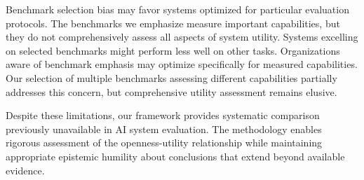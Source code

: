 Benchmark selection bias may favor systems optimized for particular evaluation protocols. The benchmarks we emphasize measure important capabilities, but they do not comprehensively assess all aspects of system utility. Systems excelling on selected benchmarks might perform less well on other tasks. Organizations aware of benchmark emphasis may optimize specifically for measured capabilities. Our selection of multiple benchmarks assessing different capabilities partially addresses this concern, but comprehensive utility assessment remains elusive.

Despite these limitations, our framework provides systematic comparison previously unavailable in AI system evaluation. The methodology enables rigorous assessment of the openness-utility relationship while maintaining appropriate epistemic humility about conclusions that extend beyond available evidence.
